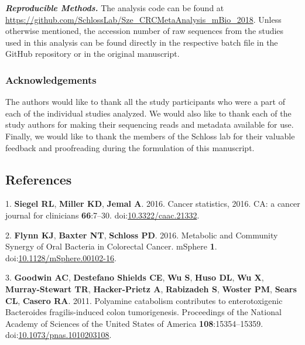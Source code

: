 \documentclass[12pt,]{article}
\begin{document}
\textbf{\emph{Reproducible Methods.}} The analysis code can be found at
\url{https://github.com/SchlossLab/Sze_CRCMetaAnalysis_mBio_2018}.
Unless otherwise mentioned, the accession number of raw sequences from
the studies used in this analysis can be found directly in the
respective batch file in the GitHub repository or in the original
manuscript.

\newpage

\subsubsection{Acknowledgements}\label{acknowledgements}

The authors would like to thank all the study participants who were a
part of each of the individual studies analyzed. We would also like to
thank each of the study authors for making their sequencing reads and
metadata available for use. Finally, we would like to thank the members
of the Schloss lab for their valuable feedback and proofreading during
the formulation of this manuscript.

\newpage

\subsection{References}\label{references}

\hypertarget{refs}{}
\hypertarget{ref-siegel_cancer_2016}{}
1. \textbf{Siegel RL}, \textbf{Miller KD}, \textbf{Jemal A}. 2016.
Cancer statistics, 2016. CA: a cancer journal for clinicians
\textbf{66}:7--30.
doi:\href{https://doi.org/10.3322/caac.21332}{10.3322/caac.21332}.

\hypertarget{ref-flynn_metabolic_2016}{}
2. \textbf{Flynn KJ}, \textbf{Baxter NT}, \textbf{Schloss PD}. 2016.
Metabolic and Community Synergy of Oral Bacteria in Colorectal Cancer.
mSphere \textbf{1}.
doi:\href{https://doi.org/10.1128/mSphere.00102-16}{10.1128/mSphere.00102-16}.

\hypertarget{ref-goodwin_polyamine_2011}{}
3. \textbf{Goodwin AC}, \textbf{Destefano Shields CE}, \textbf{Wu S},
\textbf{Huso DL}, \textbf{Wu X}, \textbf{Murray-Stewart TR},
\textbf{Hacker-Prietz A}, \textbf{Rabizadeh S}, \textbf{Woster PM},
\textbf{Sears CL}, \textbf{Casero RA}. 2011. Polyamine catabolism
contributes to enterotoxigenic Bacteroides fragilis-induced colon
tumorigenesis. Proceedings of the National Academy of Sciences of the
United States of America \textbf{108}:15354--15359.
doi:\href{https://doi.org/10.1073/pnas.1010203108}{10.1073/pnas.1010203108}.
\end{document}
